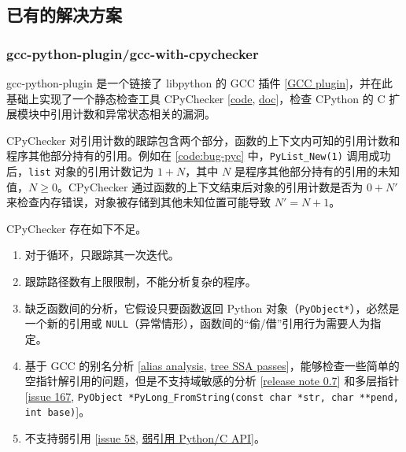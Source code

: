 \subsection{已有的解决方案}

\subsubsection{gcc-python-plugin/gcc-with-cpychecker}

gcc-python-plugin 是一个链接了 libpython 的 GCC 插件 [\href{https://gcc.gnu.org/onlinedocs/gccint/Plugins.html}{GCC plugin}]，并在此基础上实现了一个静态检查工具 CPyChecker [\href{https://github.com/davidmalcolm/gcc-python-plugin/blob/master/gcc-with-cpychecker}{code}, \href{https://gcc-python-plugin.readthedocs.io/en/latest/cpychecker.html}{doc}]，检查 CPython 的 C 扩展模块中引用计数和异常状态相关的漏洞。

CPyChecker 对引用计数的跟踪包含两个部分，函数的上下文内可知的引用计数和程序其他部分持有的引用。例如在 \autoref{code:bug-pyc} 中，\texttt{PyList\_New(1)} 调用成功后，\texttt{list} 对象的引用计数记为 $1+N$，其中 $N$ 是程序其他部分持有的引用的未知值，$N \ge 0$。CPyChecker 通过函数的上下文结束后对象的引用计数是否为 $0 + N'$ 来检查内存错误，对象被存储到其他未知位置可能导致 $N' = N + 1$。

CPyChecker 存在如下不足。

\begin{enumerate}
\item 对于循环，只跟踪其一次迭代。
\item 跟踪路径数有上限限制，不能分析复杂的程序。
\item 缺乏函数间的分析，它假设只要函数返回 Python 对象（\texttt{PyObject*}），必然是一个新的引用或 \texttt{NULL}（异常情形），函数间的“偷/借”引用行为需要人为指定。
\item 基于 GCC 的别名分析 [\href{https://gcc.gnu.org/onlinedocs/gccint/Alias-analysis.html}{alias analysis}, \href{https://gcc.gnu.org/onlinedocs/gccint/Tree-SSA-passes.html}{tree SSA passes}]，能够检查一些简单的空指针解引用的问题，但是不支持域敏感的分析 [\href{https://gcc-python-plugin.readthedocs.io/en/latest/0.7.html#signal-noise-ratio-improvements}{release note 0.7}] 和多层指针 [\href{https://github.com/davidmalcolm/gcc-python-plugin/issues/167}{issue 167}, \texttt{PyObject *PyLong\_FromString(const char *str, char **pend, int base)}]。
\item 不支持弱引用 [\href{https://github.com/davidmalcolm/gcc-python-plugin/issues/58}{issue 58}, \href{https://docs.python.org/3/c-api/weakref.html}{弱引用 Python/C API}]。
\end{enumerate}

